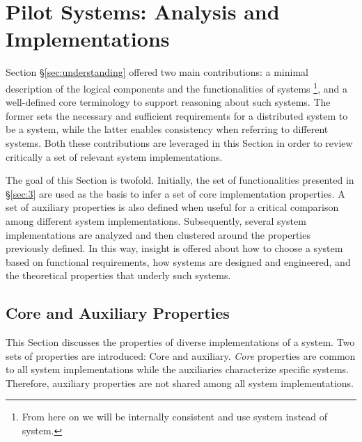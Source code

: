 \documentclass{sig-alternate}
\begin{document}

\section{Pilot Systems: Analysis and Implementations}
\label{sec:analysis}

Section \S\ref{sec:understanding} offered two main contributions: a minimal description of
the logical components and the functionalities of \pilot systems \footnote{
From here on we will be internally consistent and use \pilot system instead of
\pilotjob system.}, and a well-defined core terminology to support reasoning
about such systems.
The former sets the necessary and sufficient requirements for a distributed
system to be a \pilot system, while the latter enables consistency when
referring to different \pilot systems. Both these contributions are leveraged
in this Section in order to review critically a set of relevant \pilot system
implementations.

The goal of this Section is twofold.  Initially, the set of
functionalities presented in \S\ref{sec:3} are used as the basis
to infer a set of core implementation properties. A set of auxiliary
properties is also defined when useful for a critical comparison among
different \pilot system implementations. Subsequently, several \pilot system
implementations are analyzed and then clustered around the properties
previously defined. In this way, insight is offered about how to
choose a \pilot system based on functional requirements, how
\pilot systems are designed and engineered, and the theoretical
properties that underly such systems.

\subsection{Core and Auxiliary Properties}
\label{sec:properties}

This Section discusses the properties of diverse implementations of a \pilot
system. Two sets of properties are introduced: Core and auxiliary.
\textit{Core} properties are common to all \pilot system implementations while
the auxiliaries characterize specific \pilot systems. Therefore, auxiliary
properties are not shared among all \pilot system implementations.
\end{document}
